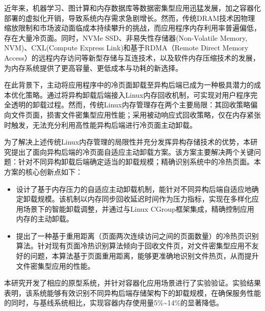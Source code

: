 	
\begin{chineseabstract}

近年来，机器学习、图计算和内存数据库等数据密集型应用迅猛发展，加之容器化部署的虚拟化开销，导致系统内存需求急剧增长。然而，传统DRAM技术因物理缩放限制和市场波动面临成本持续攀升的挑战，而应用程序内存利用率普遍偏低，存在大量冷页面。同时，NVMe SSD、非易失性存储器(Non-Volatile Memory, NVM)、CXL(Compute Express Link)和基于RDMA（Remote Direct Memory Access）的远程内存访问等新型存储与互连技术，以及软件内存压缩技术的发展，为内存系统提供了更高容量、更低成本与功耗的新选择。

在此背景下，主动将应用程序中的冷页面卸载至异构后端已成为一种极具潜力的成本优化策略。通过将异构卸载后端接入Linux内存回收机制，可实现对用户程序完全透明的卸载过程。然而，传统Linux内存管理存在两个主要局限：其回收策略偏向文件页面，损害文件密集型应用性能；采用被动响应式回收策略，仅在内存紧张时触发，无法充分利用高性能异构后端进行冷页面主动卸载。

为了解决上述传统Linux内存管理的局限性并充分发挥异构存储技术的优势，本研究提出了面向异构后端的冷页面自适应主动卸载方案。该方案主要解决两个关键问题：针对不同异构卸载后端确定适当的卸载规模；精确识别系统中的冷热页面。本方案的核心创新点如下：
\begin{itemize}
    \item 设计了基于内存压力的自适应主动卸载机制，能针对不同异构后端自适应地确定卸载规模。该机制以内存同步回收延迟时间作为压力指标，实现在多样化应用场景下的智能卸载调整，并通过与Linux CGroup框架集成，精确控制应用内存的主动卸载。
    \item 提出了一种基于重用距离（页面两次连续访问之间的页面数量）的冷热页识别算法。针对现有页面冷热识别算法倾向于回收文件页，对文件密集型应用不友好的问题，本算法基于页面重用距离，能够更准确地识别文件热页，从而提升文件密集型应用的性能。
\end{itemize}

本研究开发了相应的原型系统，并针对容器化应用场景进行了实验验证。实验结果表明，该系统能够有效识别不同异构后端存储架构下的卸载规模，在确保服务性能的同时，与基线系统相比，实现容器内存使用量5\%\~{}14\%的显著降低。

\end{chineseabstract}
